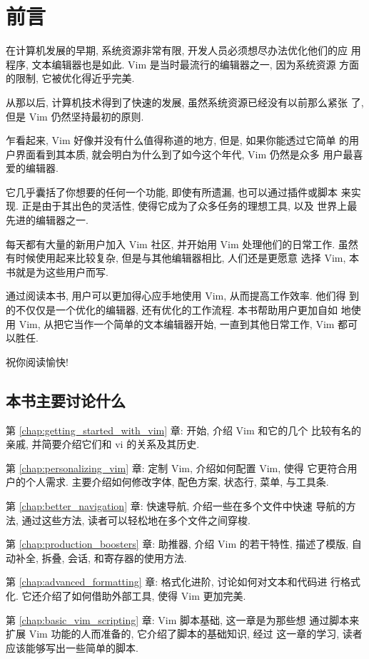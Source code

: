 \chapter{前言}
\label{chap:preface}
在计算机发展的早期, 系统资源非常有限, 开发人员必须想尽办法优化他们的应
用程序, 文本编辑器也是如此. Vim 是当时最流行的编辑器之一, 因为系统资源
方面的限制, 它被优化得近乎完美.

从那以后, 计算机技术得到了快速的发展, 虽然系统资源已经没有以前那么紧张
了, 但是 Vim 仍然坚持最初的原则.

乍看起来, Vim 好像并没有什么值得称道的地方, 但是, 如果你能透过它简单
的用户界面看到其本质, 就会明白为什么到了如今这个年代, Vim 仍然是众多
用户最喜爱的编辑器.

它几乎囊括了你想要的任何一个功能, 即使有所遗漏, 也可以通过插件或脚本
来实现. 正是由于其出色的灵活性, 使得它成为了众多任务的理想工具, 以及
世界上最先进的编辑器之一.

每天都有大量的新用户加入 Vim 社区, 并开始用 Vim 处理他们的日常工作.
虽然有时候使用起来比较复杂, 但是与其他编辑器相比, 人们还是更愿意
选择 Vim, 本书就是为这些用户而写.

通过阅读本书, 用户可以更加得心应手地使用 Vim, 从而提高工作效率. 他们得
到的不仅仅是一个优化的编辑器, 还有优化的工作流程. 本书帮助用户更加自如
地使用 Vim, 从把它当作一个简单的文本编辑器开始, 一直到其他日常工作, Vim
都可以胜任.

祝你阅读愉快!

\section*{本书主要讨论什么}
第 \ref{chap:getting_started_with_vim} 章: 开始, 介绍 Vim 和它的几个
比较有名的亲戚, 并简要介绍它们和 vi 的关系及其历史.

第 \ref{chap:personalizing_vim} 章: 定制 Vim, 介绍如何配置 Vim, 使得
它更符合用户的个人需求. 主要介绍如何修改字体, 配色方案, 状态行, 菜单,
与工具条.

第 \ref{chap:better_navigation} 章: 快速导航, 介绍一些在多个文件中快速
导航的方法, 通过这些方法, 读者可以轻松地在多个文件之间穿梭.

第 \ref{chap:production_boosters} 章: 助推器, 介绍 Vim 的若干特性,
描述了模版, 自动补全, 拆叠, 会话, 和寄存器的使用方法.

第 \ref{chap:advanced_formatting} 章: 格式化进阶, 讨论如何对文本和代码进
行格式化. 它还介绍了如何借助外部工具, 使得 Vim 更加完美.

第 \ref{chap:basic_vim_scripting} 章: Vim 脚本基础, 这一章是为那些想
通过脚本来扩展 Vim 功能的人而准备的, 它介绍了脚本的基础知识, 经过
这一章的学习, 读者应该能够写出一些简单的脚本.

